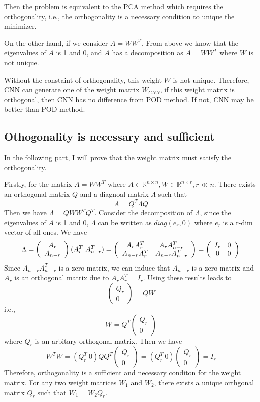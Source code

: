 Then the problem is equivalent to the PCA method which requires the orthogonality, i.e., the orthogonality is a necessary condition to unique the minimizer.

On the other hand, if we consider $A = WW^T$. From above we know that the eigenvalues of $A$ is 1 and 0, and $A$ has a decomposition as $A = WW^T$ where $W$ is not unique.

Without the constaint of orthogonality, this weight $W$ is not unique. Therefore, CNN can generate one of the weight matrix $W_{CNN}$, if this weight matrix is orthogonal, then CNN has no difference from POD method. If not, CNN may be better than POD method.

\subsection{Othogonality is necessary and sufficient}
In the following part, I will prove that the weight matrix must satisfy the orthogonality.

Firstly, for the matrix $A = WW^T$ where $A\in \mathbb{R}^{n\times n}, W \in \mathbb{R}^{n\times r}, r\ll n$. There exists an orthogonal matrix $Q$ and a diagnoal matrix $\Lambda$ such that
$$
A = Q^T \Lambda Q
$$
Then we have $\Lambda = QWW^TQ^T$. Consider the decomposition of $\Lambda$, since the eigenvalues of $A$ is 1 and 0, $\Lambda$ can be written as $diag(e_r, 0)$ where $e_r$ is a r-dim vector of all ones. We have
$$
\Lambda= \left( \begin{array}{c}
	A_r \\
	A_{n-r}
	\end{array}\right) (A_r^T \ A_{n-r}^T) = \left(\begin{array}{c c}
	A_rA_r^T & A_rA_{n-r}^T \\
	A_{n-r}A_r^T & A_{n-r}A_{n-r}^T
\end{array}\right)
= \left(\begin{array}{c c}
	I_r & 0 \\
	0 & 0
\end{array}\right)
$$
Since $ A_{n-r}A_{n-r}^T$ is a zero matrix, we can induce that $A_{n-r}$ is a zero matrix and $A_r$ is an orthogonal matrix due to $A_rA_r^T= I_r$. Using these results leads to
$$
\left( \begin{array}{c}
	Q_r \\
	0
\end{array}\right) = QW
$$
i.e.,
$$
W = Q^T\left( \begin{array}{c}
	Q_r \\
	0
\end{array}\right) 
$$
where $Q_r$ is an arbitary orthogonal matrix. Then we have
$$
W^TW = (Q_r^T \ 0) QQ^T \left(\begin{aligned}
	Q_r \\
	0
\end{aligned}\right) = (Q_r^T \ 0) \left(\begin{aligned}
Q_r \\
0
\end{aligned}\right) = I_r
$$
Therefore, orthogonality is a sufficient and necessary conditon for the weight matrix. For any two weight matrices $W_1$ and $W_2$, there exists a unique orthgonal matrix $Q_r$ such that $W_1 = W_2Q_r$.